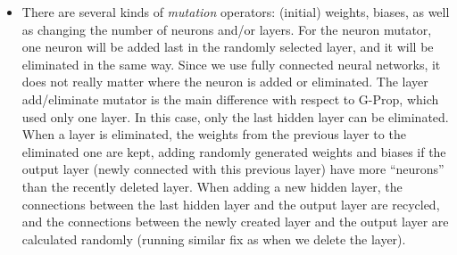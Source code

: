 \documentclass[conference]{IEEEtran}\usepackage[]{graphicx}\usepackage[]{color}
\begin{document}
\begin{itemize}
    
  \item There are several kinds of {\em mutation} operators: (initial) weights,
    biases, as well as changing the number of neurons and/or
    layers. For the neuron mutator, one neuron will be added last in the
    randomly selected layer, and it will be eliminated in the same way. Since
    we use fully connected neural networks, it does not really matter where the
    neuron is added or eliminated. The layer add/eliminate mutator is the
    main difference with respect to G-Prop, which used only one
    layer. In this case, only the last hidden layer can be eliminated. When a
    layer is eliminated, the weights from the previous layer to the eliminated
    one are kept, adding randomly generated weights and biases if the output
    layer (newly connected with this previous layer) have more ``neurons'' than
    the recently deleted layer. When adding a new hidden layer, the connections
    between the last hidden layer and the output layer are recycled, and the
    connections between the newly created layer and the output layer are
    calculated randomly (running similar fix as when we delete the layer).

\end{itemize}
\end{document}
